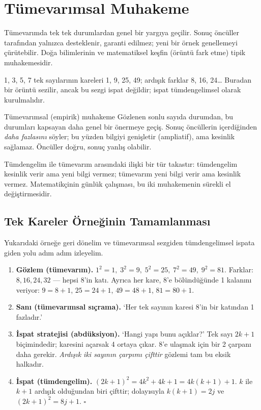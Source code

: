 \section{Tümevarımsal Muhakeme}

Tümevarımda tek tek durumlardan genel bir yargıya geçilir. Sonuç öncüller tarafından yalnızca desteklenir, garanti edilmez; yeni bir örnek genellemeyi çürütebilir. Doğa bilimlerinin ve matematiksel keşfin (örüntü fark etme) tipik muhakemesidir.

\begin{ornek}
1, 3, 5, 7 tek sayılarının kareleri 1, 9, 25, 49; ardışık farklar 8, 16, 24… Buradan bir örüntü sezilir, ancak bu sezgi ispat değildir; ispat tümdengelimsel olarak kurulmalıdır.
\end{ornek}

\begin{tanim}{Tümevarımsal (empirik) muhakeme}
Gözlenen sonlu sayıda durumdan, bu durumları kapsayan daha genel bir önermeye geçiş. Sonuç öncüllerin içerdiğinden \emph{daha fazlasını} söyler; bu yüzden bilgiyi genişletir (ampliatif), ama kesinlik sağlamaz. Öncüller doğru, sonuç yanlış olabilir.
\end{tanim}

Tümdengelim ile tümevarım arasındaki ilişki bir tür takastır: tümdengelim kesinlik verir ama yeni bilgi vermez; tümevarım yeni bilgi verir ama kesinlik vermez. Matematikçinin günlük çalışması, bu iki muhakemenin sürekli el değiştirmesidir.

\subsection{Tek Kareler Örneğinin Tamamlanması}

Yukarıdaki örneğe geri dönelim ve tümevarımsal sezgiden tümdengelimsel ispata giden yolu adım adım izleyelim.

\begin{enumerate}[leftmargin=1.6em,label=\textbf{\arabic*.}]
\item \textbf{Gözlem (tümevarım).} $1^2=1,\;3^2=9,\;5^2=25,\;7^2=49,\;9^2=81$. Farklar: $8,16,24,32$ — hepsi 8’in katı. Ayrıca her kare, 8’e bölündüğünde 1 kalanını veriyor: $9=8+1$, $25=24+1$, $49=48+1$, $81=80+1$.
\item \textbf{Sanı (tümevarımsal sıçrama).} ‘Her tek sayının karesi 8’in bir katından 1 fazladır.’
\item \textbf{İspat stratejisi (abdüksiyon).} ‘Hangi yapı bunu açıklar?’ Tek sayı $2k+1$ biçimindedir; karesini açarsak 4 ortaya çıkar. 8’e ulaşmak için bir 2 çarpanı daha gerekir. \emph{Ardışık iki sayının çarpımı çifttir} gözlemi tam bu eksik halkadır.
\item \textbf{İspat (tümdengelim).} $(2k+1)^2=4k^2+4k+1=4k(k+1)+1$. $k$ ile $k+1$ ardışık olduğundan biri çifttir; dolayısıyla $k(k+1)=2j$ ve $(2k+1)^2=8j+1$. $\square$
\end{enumerate}

